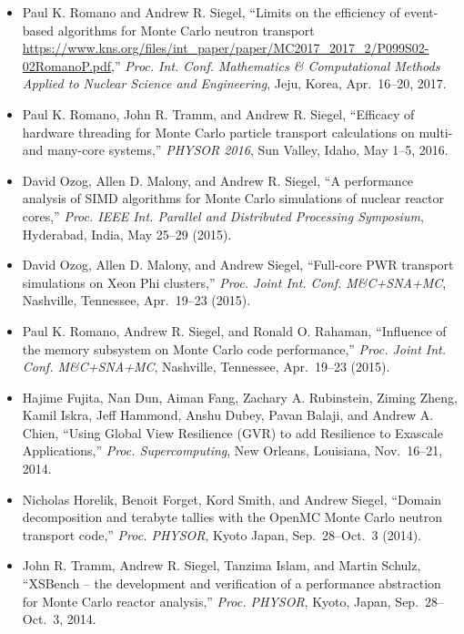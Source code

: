 \begin{itemize}

\item Paul K. Romano and Andrew R. Siegel, ``Limits on the efficiency of event-based
algorithms for Monte Carlo neutron transport
\url{https://www.kns.org/files/int_paper/paper/MC2017_2017_2/P099S02-02RomanoP.pdf},''
\textit{Proc. Int. Conf. Mathematics \& Computational Methods Applied to Nuclear
Science and Engineering}, Jeju, Korea, Apr.\ 16--20, 2017.

\item Paul K. Romano, John R. Tramm, and Andrew R. Siegel, ``Efficacy of hardware
threading for Monte Carlo particle transport calculations on multi- and
many-core systems,'' \textit{PHYSOR 2016}, Sun Valley, Idaho, May 1--5, 2016.

\item David Ozog, Allen D. Malony, and Andrew R. Siegel, ``A performance analysis of
SIMD algorithms for Monte Carlo simulations of nuclear reactor cores,''
\textit{Proc. IEEE Int. Parallel and Distributed Processing Symposium}, Hyderabad,
India, May 25--29 (2015).

\item David Ozog, Allen D. Malony, and Andrew Siegel, ``Full-core PWR transport
simulations on Xeon Phi clusters,'' \textit{Proc. Joint Int. Conf. M\&C+SNA+MC},
Nashville, Tennessee, Apr.\ 19--23 (2015).

\item Paul K. Romano, Andrew R. Siegel, and Ronald O. Rahaman, ``Influence of the
memory subsystem on Monte Carlo code performance,'' \textit{Proc. Joint
Int. Conf. M\&C+SNA+MC}, Nashville, Tennessee, Apr.\ 19--23 (2015).

\item Hajime Fujita, Nan Dun, Aiman Fang, Zachary A. Rubinstein, Ziming Zheng, Kamil
Iskra, Jeff Hammond, Anshu Dubey, Pavan Balaji, and Andrew A. Chien, ``Using
Global View Resilience (GVR) to add Resilience to Exascale Applications,''
\textit{Proc. Supercomputing}, New Orleans, Louisiana, Nov.\ 16--21, 2014.

\item Nicholas Horelik, Benoit Forget, Kord Smith, and Andrew Siegel, ``Domain
decomposition and terabyte tallies with the OpenMC Monte Carlo neutron
transport code,'' \textit{Proc. PHYSOR}, Kyoto Japan, Sep.\ 28--Oct.\ 3 (2014).

\item John R. Tramm, Andrew R. Siegel, Tanzima Islam, and Martin Schulz, ``XSBench --
the development and verification of a performance abstraction for Monte Carlo
reactor analysis,'' \textit{Proc. PHYSOR}, Kyoto, Japan, Sep.\ 28--Oct.\ 3, 2014.


\end{itemize}
